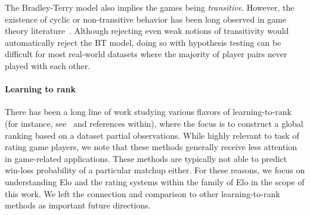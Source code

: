 The Bradley-Terry model also implies the games being \emph{transitive}. However, the existence of cyclic or non-transitive behavior has been long observed in game theory literature~\citep{samothrakis2012coevolving,chen2016modeling,omidshafiei2019alpha,czarnecki2020real}. Although rejecting even weak notions of transitivity would automatically reject the BT model, doing so with hypothesis testing can be difficult for most real-world datasets where the majority of player pairs never played with each other.

\paragraph{Learning to rank}
There has been a long line of work studying various flavors of learning-to-rank (for instance, see~\citet{liu2009learning, negahban2012iterative, braverman2009sorting, shah2018simple} and references within), where the focus is to construct a global ranking based on a dataset partial observations. 
While highly relevant to task of rating game players, we note that these methods generally receive less attention in game-related applications. These methods are typically not able to predict win-loss probability of a particular matchup either.
For these reasons, we focus on understanding Elo and the rating systems within the family of Elo in the scope of this work. We left the connection and comparison to other learning-to-rank methods as important future directions.